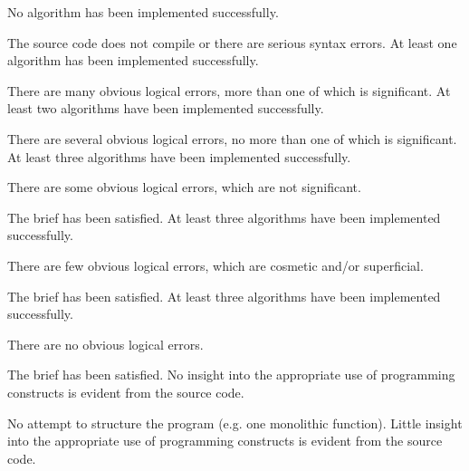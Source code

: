 \documentclass{../../fal_assignment}
\begin{document}
\begin{markingrubric}
	\grade\fail 	No algorithm has been implemented successfully.
	\par 		The source code does not compile or there are serious syntax errors.
	\grade 		At least one algorithm has been  implemented successfully.
	\par 		There are many obvious logical errors, more than one of which is significant.   
	\grade 		At least two algorithms have been  implemented successfully.
	\par 		There are several obvious logical errors, no more than one of which is significant. 
	\grade 		At least three algorithms have been implemented successfully.
	\par 		There are some obvious logical errors, which are not significant. 
	\par		The brief has been satisfied.
	\grade 		At least three algorithms have been  implemented successfully.
	\par 		There are few obvious logical errors, which are cosmetic and/or superficial.
	\par		The brief has been satisfied.     
	\grade 		At least three algorithms have been  implemented successfully.
	\par		There are no obvious logical errors.
	\par		The brief has been satisfied.
	\grade\fail No insight into the appropriate use of programming constructs is evident from the source code.
	\par No attempt to structure the program (e.g. one monolithic function).
	\grade Little insight into the appropriate use of programming constructs is evident from the source code.

\end{markingrubric}
\end{document}
